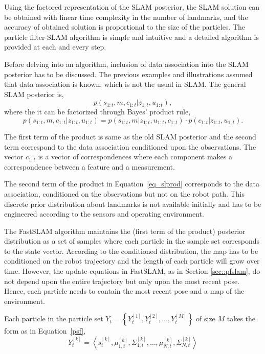 Using the factored representation of the SLAM posterior, the SLAM solution can be obtained with linear time complexity in the number of landmarks, and the accuracy of obtained solution is proportional to the size of the particles. The particle filter-SLAM algorithm is simple and intuitive and a detailed algorithm is provided at each and every step.

Before delving into an algorithm, inclusion of data association into the SLAM posterior has to be discussed. The previous examples and illustrations assumed that data association is known, which is not the usual in SLAM. The general SLAM posterior is,
\begin{equation}
p(s_{1:t},m,c_{1:t}|z_{1:t},u_{1:t}),
\end{equation}  
where the it can be factorized through Bayes' product rule,
\begin{equation}
p(s_{1:t},m,c_{1:t}|z_{1:t},u_{1:t}) = p(s_{1:t},m|z_{1:t},u_{1:t},c_{1:t})\cdot p(c_{1:t}|z_{1:t},u_{1:t}).
\label{eq_slprod}
\end{equation}

The first term of the product is same as the old SLAM posterior and the second term correspond to the data association conditioned upon the observations. The vector $c_{1:t}$ is a vector of correspondences where each component makes a correspondence between a feature and a measurement.

\begin{rem}
The second term of the product in Equation~\ref{eq_slprod} corresponds to the data association, conditioned on the observations but not on the robot path. This discrete prior distribution about landmarks is not available initially and has to be engineered according to the sensors and operating environment.
\end{rem}

The FastSLAM algorithm maintains the (first term of the product) posterior distribution as a set of samples where each particle in the sample set corresponds to the state vector. According to the conditioned distribution, the map has to be conditioned on the robot trajectory and the length of each particle will grow over time. However, the update equations in FastSLAM, as in Section \ref{sec::pfslam}, do not depend upon the entire trajectory but only upon the most recent pose. Hence, each particle needs to contain the most recent pose and a map of the environment.

Each particle in the particle set $Y_t=\left\lbrace Y_t^{[1]}, Y_t^{[2]}, \dots, Y_t^{[M]}\right\rbrace$ of size $M$ takes the form as in Equation~\ref{psf},
\begin{equation}
Y_t^{[k]}=\left\langle s_t^{[k]}, \mu_{1,t}^{[k]}, \Sigma_{1,t}^{[k]}, \dots, \mu_{N,t}^{[k]}, \Sigma_{N,t}^{[k]} \right\rangle
\end{equation}  

